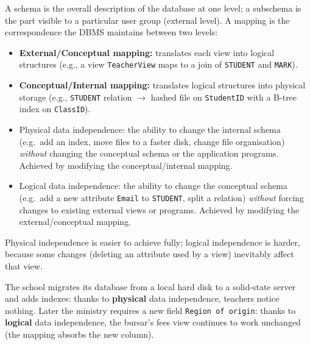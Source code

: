 \documentclass[11pt]{article}
\newcommand{\cle}[1]{{\popxbold\color{popdark}#1}}
\begin{document}
\begin{definition}
A \cle{schema} is the overall description of the database at one level; a \cle{subschema} is the part visible to a particular user group (external level). A \cle{mapping} is the correspondence the DBMS maintains between two levels:
\begin{itemize}
\item \textbf{External/Conceptual mapping:} translates each view into logical structures (e.g., a view \texttt{TeacherView} maps to a join of \texttt{STUDENT} and \texttt{MARK}).
\item \textbf{Conceptual/Internal mapping:} translates logical structures into physical storage (e.g., \texttt{STUDENT} relation $\to$ hashed file on \texttt{StudentID} with a B-tree index on \texttt{ClassID}).
\end{itemize}
\end{definition}

\begin{definition}
\begin{itemize}
\item \cle{Physical data independence}: the ability to change the internal schema (e.g.\ add an index, move files to a faster disk, change file organisation) \emph{without} changing the conceptual schema or the application programs. Achieved by modifying the conceptual/internal mapping.
\item \cle{Logical data independence}: the ability to change the conceptual schema (e.g.\ add a new attribute \texttt{Email} to \texttt{STUDENT}, split a relation) \emph{without} forcing changes to existing external views or programs. Achieved by modifying the external/conceptual mapping.
\end{itemize}
Physical independence is easier to achieve fully; logical independence is harder, because some changes (deleting an attribute used by a view) inevitably affect that view.
\end{definition}

\begin{exemplebox}
The school migrates its database from a local hard disk to a solid-state server and adds indexes: thanks to \textbf{physical} data independence, teachers notice nothing. Later the ministry requires a new field \texttt{Region of origin}: thanks to \textbf{logical} data independence, the bursar's fees view continues to work unchanged (the mapping absorbs the new column).
\end{exemplebox}
\end{document}

